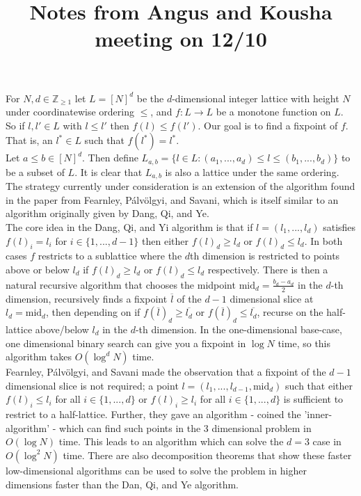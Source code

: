 \documentclass{article}
\title{Notes from Angus and Kousha meeting on 12/10}
\newcommand{\Z}{\mathbb{Z}}
\newcommand{\mi}{\text{mid}}
\newcommand{\pav}{Pálvölgyi}
\begin{document}
  \maketitle

    For $N, d \in \Z_{\geq 1}$ let  $L = [N]^d$ be the $d$-dimensional integer lattice with height $N$ under coordinatewise ordering $\leq$, and $f: L \to L$ be
   a monotone function on $L$. So if $l, l' \in L$ with $l \leq l'$ then $f(l) \leq f(l')$. 
   Our goal is to find a fixpoint of $f$. That is, an $l^* \in L$ such that $f(l^*) = l^*$.\\

  Let $a \leq b \in [N]^d$. Then define $L_{a, b} = \{ l \in L : (a_1, ..., a_d) \leq l \leq (b_1, ..., b_d) \}$ 
  to be a subset of $L$.
  It is clear that $L_{a, b}$ is also a lattice under the same ordering. \\

  The strategy currently under consideration is an extension of the algorithm found in
  the paper from Fearnley, Pálvölgyi, and Savani\cite{FePaSa}, which is itself similar
  to an algorithm originally given by Dang, Qi, and Ye\cite{DangQiYe}. \\

  The core idea
  in the Dang, Qi, and Yi algorithm is that if $l = (l_1, ..., l_d)$ satisfies
  $f(l)_i = l_i$ for $i \in \{1, ..., d-1\}$ then either $f(l)_d \geq l_d$ or $f(l)_d \leq l_d$.
  In both cases $f$ restricts to a sublattice where the $d$th dimension is restricted to points
  above or below $l_d$ if $f(l)_d \geq l_d$ or $f(l)_d \leq l_d$ respectively. There
  is then a natural recursive algorithm that chooses the midpoint $\mi_d = \frac{b_d - a_d}{2}$ in the $d$-th dimension,
  recursively finds a fixpoint $\overline{l}$ of the $d-1$ dimensional slice at $l_d = \mi_d$, then 
  depending on if $f(\overline{l})_d \geq \overline{l_d}$ or $f(\overline{l})_d \leq \overline{l_d}$,
  recurse on the half-lattice above/below $l_d$ in the $d$-th dimension. In the one-dimensional base-case,
  one dimensional binary search can give you a fixpoint in $\log N$ time, so this algorithm takes
  $O(\log^d N)$ time.\\

  
  Fearnley, \pav, and Savani made the observation that a fixpoint of the $d-1$ dimensional slice is not required; 
  a point $l = (l_1, ..., l_{d-1}, \mi_d)$ such that either $f(l)_i \leq l_i$ for all $i \in \{1, ..., d\}$ or 
  $f(l)_i \geq l_i$ for all $i \in \{1, ..., d\}$ is sufficient to restrict to a half-lattice. Further,
  they gave an algorithm - coined the 'inner-algorithm' - which can find
  such points in the 3 dimensional problem in $O(\log N)$ time. This leads to an algorithm which
  can solve the $d=3$ case in $O(\log^2 N)$ time. There are also decomposition theorems that show these faster
  low-dimensional algorithms can be used to solve the problem in higher dimensions faster than
  the Dan, Qi, and Ye algorithm. \\
\end{document}
